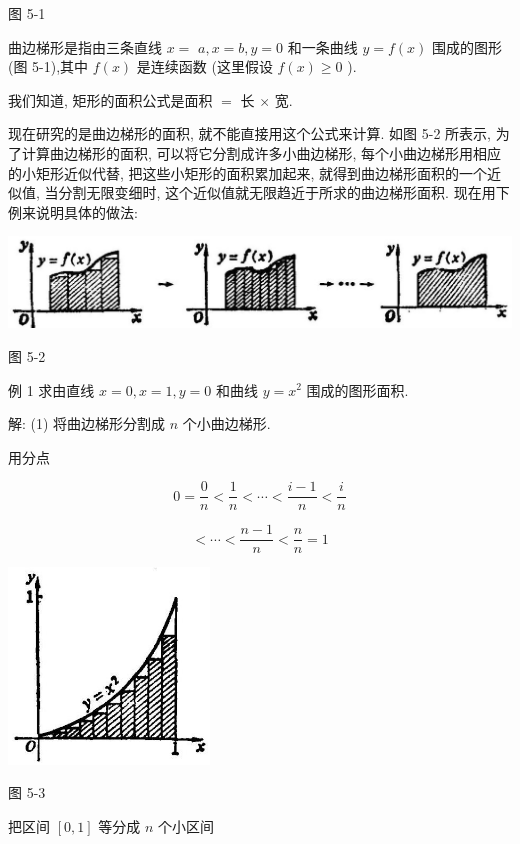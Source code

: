 \documentclass[lang=cn,newtx,12pt,scheme=chinese]{elegantbook}
\begin{document}
图 5-1

曲边梯形是指由三条直线 \(x =\) \(a,x = b,y = 0\) 和一条曲线 \(y = f\left( x\right)\) 围成的图形(图 5-1),其中 \(f\left( x\right)\) 是连续函数 (这里假设 \(f\left( x\right) \geq 0\) ).

我们知道, 矩形的面积公式是面积 \(=\) 长 \(\times\) 宽.

现在研究的是曲边梯形的面积, 就不能直接用这个公式来计算. 如图 5-2 所表示, 为了计算曲边梯形的面积, 可以将它分割成许多小曲边梯形, 每个小曲边梯形用相应的小矩形近似代替, 把这些小矩形的面积累加起来, 就得到曲边梯形面积的一个近似值, 当分割无限变细时, 这个近似值就无限趋近于所求的曲边梯形面积. 现在用下例来说明具体的做法:

\begin{center}
\includegraphics[max width=1.0\textwidth]{images/01912c18-5c3f-733d-b775-749ba9897a9d_216_513151.jpg}
\end{center}

图 5-2

例 1 求由直线 \(x = 0,x = 1,y = 0\) 和曲线 \(y = {x}^{2}\) 围成的图形面积.

解: (1) 将曲边梯形分割成 \(n\) 个小曲边梯形.

用分点

\[
0 = \frac{0}{n} < \frac{1}{n} < \cdots < \frac{i - 1}{n} < \frac{i}{n}
\]

\[
< \cdots < \frac{n - 1}{n} < \frac{n}{n} = 1
\]

\begin{center}
\includegraphics[max width=0.4\textwidth]{images/01912c18-5c3f-733d-b775-749ba9897a9d_217_504981.jpg}
\end{center}

图 5-3

把区间 \(\left\lbrack {0,1}\right\rbrack\) 等分成 \(n\) 个小区间
\end{document}
